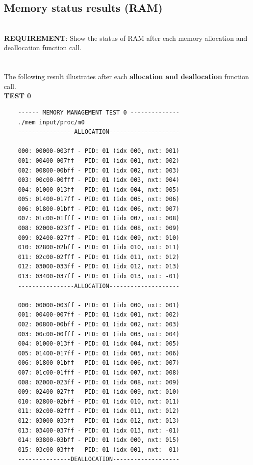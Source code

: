\documentclass[a4paper]{article}
\begin{document}
	\subsection{Memory status results (RAM)}
	\hfill\\
	\textbf{REQUIREMENT}: Show the status of RAM after each memory allocation and deallocation function call.\\
	\\
	\\
	The following result illustrates  after each \textbf{allocation and deallocation} function call. \\
	\newpage
	{\bfseries TEST 0} \\
	
	\begin{lstlisting}
    ------ MEMORY MANAGEMENT TEST 0 --------------
    ./mem input/proc/m0
    ----------------ALLOCATION--------------------

    000: 00000-003ff - PID: 01 (idx 000, nxt: 001)
    001: 00400-007ff - PID: 01 (idx 001, nxt: 002)
    002: 00800-00bff - PID: 01 (idx 002, nxt: 003)  
    003: 00c00-00fff - PID: 01 (idx 003, nxt: 004)
    004: 01000-013ff - PID: 01 (idx 004, nxt: 005)
    005: 01400-017ff - PID: 01 (idx 005, nxt: 006)
    006: 01800-01bff - PID: 01 (idx 006, nxt: 007)
    007: 01c00-01fff - PID: 01 (idx 007, nxt: 008)
    008: 02000-023ff - PID: 01 (idx 008, nxt: 009)
    009: 02400-027ff - PID: 01 (idx 009, nxt: 010)
    010: 02800-02bff - PID: 01 (idx 010, nxt: 011)
    011: 02c00-02fff - PID: 01 (idx 011, nxt: 012)
    012: 03000-033ff - PID: 01 (idx 012, nxt: 013)
    013: 03400-037ff - PID: 01 (idx 013, nxt: -01)
    ----------------ALLOCATION--------------------

    000: 00000-003ff - PID: 01 (idx 000, nxt: 001)
    001: 00400-007ff - PID: 01 (idx 001, nxt: 002)
    002: 00800-00bff - PID: 01 (idx 002, nxt: 003)
    003: 00c00-00fff - PID: 01 (idx 003, nxt: 004)
    004: 01000-013ff - PID: 01 (idx 004, nxt: 005)
    005: 01400-017ff - PID: 01 (idx 005, nxt: 006)
    006: 01800-01bff - PID: 01 (idx 006, nxt: 007)
    007: 01c00-01fff - PID: 01 (idx 007, nxt: 008)
    008: 02000-023ff - PID: 01 (idx 008, nxt: 009)
    009: 02400-027ff - PID: 01 (idx 009, nxt: 010)
    010: 02800-02bff - PID: 01 (idx 010, nxt: 011)
    011: 02c00-02fff - PID: 01 (idx 011, nxt: 012)
    012: 03000-033ff - PID: 01 (idx 012, nxt: 013)
    013: 03400-037ff - PID: 01 (idx 013, nxt: -01)
    014: 03800-03bff - PID: 01 (idx 000, nxt: 015)
    015: 03c00-03fff - PID: 01 (idx 001, nxt: -01)
    ---------------DEALLOCATION-------------------
    

\end{lstlisting}
\end{document}
